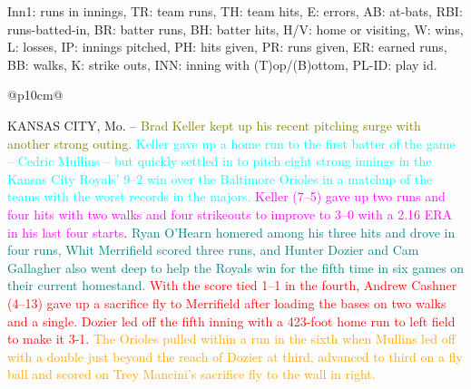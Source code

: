 \documentclass[11pt,a4paper]{article}
\newcommand{\lform}[1]{\textsf{\scriptsize{#1}}}
\newcommand{\xml}[1]{{\fontfamily{cmtt}\selectfont {#1}}}
\begin{document}
\begin{figure*}[t!]
\begin{minipage}{0.4\textwidth}
\vspace{.3cm}                        

\lform{Inn1:} runs in innings, \lform{TR:} team runs, \lform{TH:}  team hits, \lform{E:}  errors,
 \lform{AB:} at-bats, \lform{RBI:} runs-batted-in,  \lform{BR:} batter runs, 
\lform{BH:} batter hits, \lform{H/V:} home or visiting,
  \lform{W:} wins, \lform{L:} losses,  \lform{IP:} innings pitched, \lform{PH:} hits given, 
\lform{PR:} runs given, \lform{ER:} earned runs,
  \lform{BB:} walks, \lform{K:} strike outs, \lform{INN:} inning with (T)op/(B)ottom,
\lform{PL-ID:} play id.

\end{minipage}
\begin{minipage}{0.5\textwidth}
\vspace*{-2.5cm}
\footnotesize
\hspace*{-1.6cm}\begin{tabular}{@{}p{10cm}@{}} 
 \\
\hline 
  
                  {\scriptsize
                  KANSAS CITY, Mo. -- \textcolor{olive}{Brad Keller kept up his recent
                  pitching surge with another strong
                  outing.} \textcolor{blue}{\xml{P}}
		  \textcolor{cyan}{
                  Keller gave up a home run to the first batter of the game -- Cedric Mullins -- but quickly settled in to pitch eight strong innings in the Kansas City Royals' 9--2 win over the Baltimore Orioles in a matchup of the teams with the worst records in the majors.} \textcolor{blue}{\xml{P}}
                  \textcolor{magenta}{Keller (7--5) gave up two runs and four hits with two walks and four strikeouts to improve to 3--0 with a 2.16 ERA in his last four starts}. \textcolor{blue}{\xml{P}}
                  \textcolor{teal}{Ryan O'Hearn homered among his three hits and drove in four runs, Whit Merrifield scored three runs, and Hunter Dozier and Cam Gallagher also went deep to help the Royals win for the fifth time in six games on their current homestand.} \textcolor{blue}{\xml{P}}
		  \textcolor{red}{
                  With the score tied 1--1 in the fourth, Andrew Cashner (4--13) gave up a sacrifice fly to Merrifield after loading the bases on two walks and a single. Dozier led off the fifth inning with a 423-foot home run to left field to make it 3-1.} \textcolor{blue}{\xml{P}}
                  \textcolor{orange}{The Orioles pulled within a run in the sixth when Mullins led off with a double just beyond the reach of Dozier at third, advanced to third on a fly ball and scored on Trey Mancini's sacrifice fly to the wall in right.} \textcolor{blue}{\xml{P}} \lform{}
}\\ \hline
\end{tabular}
\end{minipage}
\begin{minipage}{\textwidth}
\vspace{-2.5cm}


\end{minipage}
\end{figure*}
\end{document}
